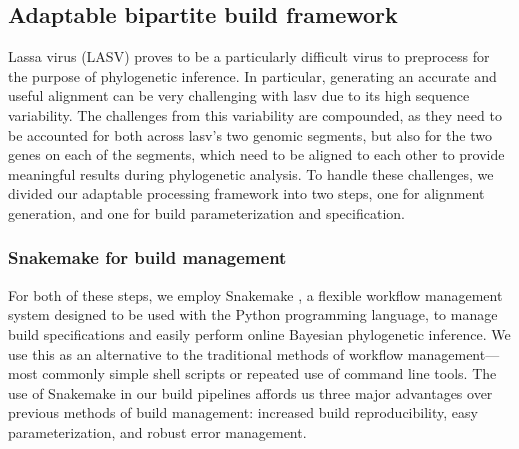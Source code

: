 \subsection{Adaptable bipartite build framework}

Lassa virus (LASV) proves to be a particularly difficult virus to preprocess for the purpose of phylogenetic inference.
In particular, generating an accurate and useful alignment can be very challenging with \gls{lasv} due to its high sequence variability.
The challenges from this variability are compounded, as they need to be accounted for both across \gls{lasv}'s two genomic segments, but also for the two genes on each of the segments, which need to be aligned to each other to provide meaningful results during phylogenetic analysis.
To handle these challenges, we divided our adaptable processing framework into two steps, one for alignment generation, and one for build parameterization and specification.

\subsubsection{Snakemake for build management}

For both of these steps, we employ Snakemake \cite{koster2012snakemake}, a flexible workflow management system designed to be used with the Python programming language, to manage build specifications and easily perform online Bayesian phylogenetic inference.
We use this as an alternative to the traditional methods of workflow management---most commonly simple shell scripts or repeated use of command line tools.
The use of Snakemake in our build pipelines affords us three major advantages over previous methods of build management: increased build reproducibility, easy parameterization, and robust error management.

